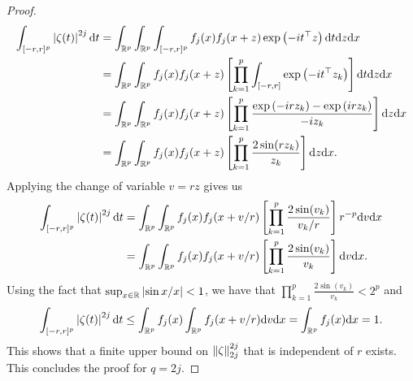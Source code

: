 \begin{proof}
\begin{align*}
        \int_{[-r, r]^p} \abs{\zeta(t)}^{2j} \d t
        &= \intRp{x}{\intRp{z}{\int_{[-r, r]^p} f_j(x)f_j(x + z)\expf{-it^\top z}\d t}}\\
        &= \intRp{x}{\intRp{z}{f_j(x)f_j(x + z)\left[\prod_{k=1}^p \int_{[-r, r]}\expf{-it^\top z_k}\right]\d t}}\\
        &= \intRp{x}{\intRp{z}{f_j(x)f_j(x + z)\left[\prod_{k=1}^p \frac{\expf{-irz_k} - \expf{irz_k}}{-iz_k} \right]}}\\
        &= \intRp{x}{\intRp{z}{f_j(x)f_j(x + z)\left[\prod_{k=1}^p \frac{2 \sin(rz_k)}{z_k} \right]}}.
    \end{align*}
    Applying the change of variable $v = r z$ gives us
    \begin{align*}
        \int_{[-r, r]^p} \abs{\zeta(t)}^{2j} \d t
        &= \intRp{x}{\intRp{v}{f_j(x)f_j(x + v/r)\left[\prod_{k=1}^p \frac{2 \sin(v_k)}{v_k/r} \right] r^{-p}}}\\
        &= \intRp{x}{\intRp{v}{f_j(x)f_j(x + v/r)\left[\prod_{k=1}^p \frac{2 \sin(v_k)}{v_k} \right]}}.
    \end{align*}
    Using the fact that $\sup_{x \in \R} \abs{\sin x / x} < 1$, we have that $\prod_{k=1}^p \frac{2 \sin(v_k)}{v_k} < 2^p$ and
    \begin{equation*}
        \int_{[-r, r]^p} \abs{\zeta(t)}^{2j} \d t
        \leq \intRp{x}{f_j(x)\intRp{v}{f_j(x + v/r)}}
        = \intRp{x}{f_j(x)} = 1.
    \end{equation*}
    This shows that a finite upper bound on $\norm{\zeta}_{2j}^{2j}$ that is independent of $r$ exists. This concludes the proof for $q = 2j$.
\end{proof}
